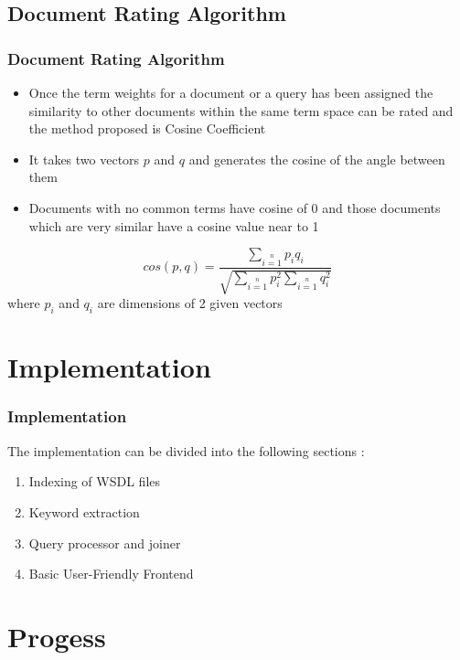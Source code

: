 \documentclass[12pt,xcolor=dvipsnames]{beamer}
\begin{document}
\subsection{Document Rating Algorithm}
\begin{frame}
 \frametitle{Document Rating Algorithm}
 \begin{itemize}
  \item Once the term weights for a document or a query has been assigned the similarity to other documents within the same term space can be rated and the method proposed is Cosine Coefficient
  \item It takes two vectors $p$ and $q$ and generates the cosine of the angle between them
  \item Documents with no common terms have cosine of 0 and those documents which are very similar have a cosine value near to 1
 \end{itemize}
 \begin{equation}
  cos\left( p, q \right) = \frac{\sum \limits_{i = 1} \limits^{n} p_{i}q_{i} }{\sqrt{\sum \limits_{i = 1} \limits^{n} p_{i}^{2} \sum \limits_{i = 1} \limits^{n} q_{i}^{2}}}
 \end{equation}
 where $p_{i}$ and $q_{i}$ are dimensions of 2 given vectors
\end{frame}

\section{Implementation}
\begin{frame}
\frametitle{Implementation}
 The implementation can be divided into the following sections :
 \begin{enumerate}
  \item Indexing of WSDL files
  \item Keyword extraction
  \item Query processor and joiner
  \item Basic User-Friendly Frontend
 \end{enumerate}
\end{frame}

\section{Progess}
\end{document}
